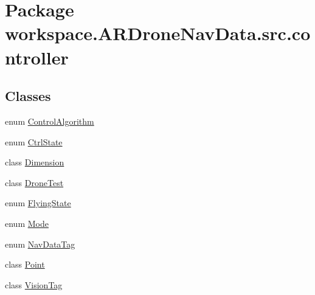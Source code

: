 \hypertarget{namespaceworkspace_1_1_a_r_drone_nav_data_1_1src_1_1controller}{}\section{Package workspace.\+A\+R\+Drone\+Nav\+Data.\+src.\+controller}
\label{namespaceworkspace_1_1_a_r_drone_nav_data_1_1src_1_1controller}
\subsection*{Classes}
\begin{DoxyCompactItemize}
\item 
enum \hyperlink{enumworkspace_1_1_a_r_drone_nav_data_1_1src_1_1controller_1_1_control_algorithm}{Control\+Algorithm}
\item 
enum \hyperlink{enumworkspace_1_1_a_r_drone_nav_data_1_1src_1_1controller_1_1_ctrl_state}{Ctrl\+State}
\item 
class \hyperlink{classworkspace_1_1_a_r_drone_nav_data_1_1src_1_1controller_1_1_dimension}{Dimension}
\item 
class \hyperlink{classworkspace_1_1_a_r_drone_nav_data_1_1src_1_1controller_1_1_drone_test}{Drone\+Test}
\item 
enum \hyperlink{enumworkspace_1_1_a_r_drone_nav_data_1_1src_1_1controller_1_1_flying_state}{Flying\+State}
\item 
enum \hyperlink{enumworkspace_1_1_a_r_drone_nav_data_1_1src_1_1controller_1_1_mode}{Mode}
\item 
enum \hyperlink{enumworkspace_1_1_a_r_drone_nav_data_1_1src_1_1controller_1_1_nav_data_tag}{Nav\+Data\+Tag}
\item 
class \hyperlink{classworkspace_1_1_a_r_drone_nav_data_1_1src_1_1controller_1_1_point}{Point}
\item 
class \hyperlink{classworkspace_1_1_a_r_drone_nav_data_1_1src_1_1controller_1_1_vision_tag}{Vision\+Tag}
\end{DoxyCompactItemize}

